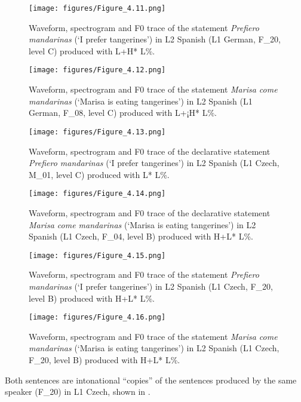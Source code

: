 \begin{figure}
\texttt{[image: figures/Figure\_4.11.png]}
\caption{Waveform, spectrogram and F0 trace of the statement \textit{Prefiero mandarinas} (‘I prefer tangerines’) in L2 Spanish (L1 German, \mbox{F\_20}, level C) produced with L+H* L\%.}
\label{fig:4.11}
\end{figure}

\begin{figure}
\texttt{[image: figures/Figure\_4.12.png]}
\caption{Waveform, spectrogram and F0 trace of the statement \textit{Marisa come mandarinas} (‘Marisa is eating tangerines’) in L2 Spanish (L1 German, \mbox{F\_08}, level C) produced with L+¡H* L\%.}
\label{fig:4.12}
\end{figure}

\begin{figure}
\texttt{[image: figures/Figure\_4.13.png]}
\caption{Waveform, spectrogram and F0 trace of the declarative statement \textit{Prefiero mandarinas} (‘I prefer tangerines’) in L2 Spanish (L1 Czech, \mbox{M\_01}, level C) produced with L* L\%.}
\label{fig:4.13}
\end{figure}

\begin{figure}
\texttt{[image: figures/Figure\_4.14.png]}
\caption{Waveform, spectrogram and F0 trace of the declarative statement \textit{Marisa come mandarinas} (‘Marisa is eating tangerines’) in L2 Spanish (L1 Czech, \mbox{F\_04}, level B) produced with H+L* L\%.}
\label{fig:4.14}
\end{figure}

\begin{figure}
\texttt{[image: figures/Figure\_4.15.png]}
\caption{Waveform, spectrogram and F0 trace of the statement \textit{Prefiero mandarinas} (‘I prefer tangerines’) in L2 Spanish (L1 Czech, \mbox{F\_20}, level B) produced with H+L* L\%.}
\label{fig:4.15}
\end{figure}

\begin{figure}
\texttt{[image: figures/Figure\_4.16.png]}
\caption{Waveform, spectrogram and F0 trace of the statement \textit{Marisa come mandarinas} (‘Marisa is eating tangerines’) in L2 Spanish (L1 Czech, \mbox{F\_20}, level B) produced with H+L* L\%.}
\label{fig:4.16}
\end{figure}

Both sentences are intonational “copies” of the sentences produced by the same speaker \mbox{(F\_20)} in L1 Czech, shown in .

